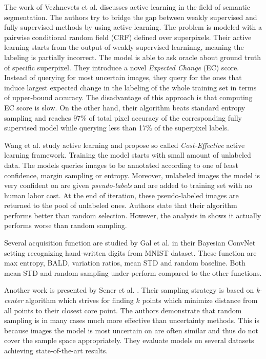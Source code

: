 The work of Vezhnevets et al. \cite{bib:vezhnevets2012active} discusses active learning in the
field of semantic segmentation. The authors try to bridge the gap between weakly supervised and fully
supervised methods by using active learning. The problem is modeled with a pairwise conditional random
field (CRF) defined over superpixels. Their active learning starts from the output
of weakly supervised learninng, meaning the labeling is partially incorrect. The model
is able to ask oracle about ground truth of specific superpixel.
They introduce a novel \textit{Expected Change} (EC) score. Instead of querying for most uncertain
images, they query for the ones that induce largest expected change in the labeling of the whole
training set in terms of upper-bound accuracy.
The disadvantage of this approach is that computing EC score is slow.
On the other hand, their algorithm beats standard entropy sampling and reaches $97\%$ of total
pixel accuracy of the corresponding fully supervised model while querying
less than 17\% of the superpixel labels.

Wang et al. \cite{bib:wang2016cost} study active learning and propose so called
\textit{Cost-Effective} active learning framework. Training the model starts with small amount
of unlabeled data. The models queries images to be annotated according to one of least confidence,
margin sampling or entropy. Moreover, unlabeled images the model is very confident on are
given \textit{pseudo-labels} and are added to training set with no human labor cost. At the end
of iteration, these pseudo-labeled images are returned to the pool of unlabeled ones.
Authors state that their algorithm performs better than random selection. However, the analysis in
\cite{bib:sener2017active} shows it actually performs worse than random sampling.

Several acquisition function are studied by Gal et al. \cite{bib:gal2017deep} in their
Bayesian ConvNet setting recognizing hand-written digits from MNIST dataset.
These function are max entropy, BALD, variation ratios, mean STD and random baseline. Both
mean STD and random sampling under-perform compared to the other functions.

Another work is presented by Sener et al. \cite{bib:sener2017active}. Their sampling strategy
is based on \textit{k-center} algorithm which strives for finding $k$ points which minimize
distance from all points to their closest core point. The authors demonstrate that random sampling
is in many cases much more effective than uncertainty methods. This is because images the model
is most uncertain on are often similar and thus do not cover the sample space appropriately.
They evaluate models on several datasets achieving state-of-the-art results.

